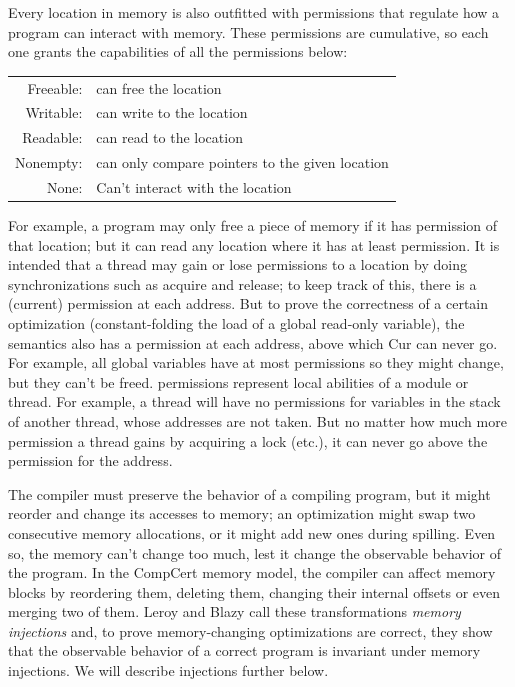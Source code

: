 Every location in memory is also outfitted with permissions that regulate how a program can interact with memory. These permissions are cumulative, so each one grants the capabilities of all the permissions below:

\begin{tabular}{rl} 
Freeable: & can free the location \\
Writable: & can write to the location\\
Readable: & can read to the location\\
Nonempty: & can only compare pointers to the given location\\
None: & Can't interact with the location\\
\end{tabular}

For example, a program may only free a piece of memory if it has  permission of that location; but it can read any location where it has at least  permission. 
It is intended that a thread may gain or lose permissions to a location by doing synchronizations such as acquire and release; to keep track of this, there is a  (current) permission at each address.  But to prove the correctness of a certain optimization (constant-folding the load of a global read-only variable), the semantics also has a  permission at each address, above which Cur can never go.
For example, all global variables have at most   permissions so they might change, but they can't be freed.  permissions represent local abilities of a module or thread. For example, a thread will have no permissions for variables in the stack of another thread, whose addresses are not taken. But no matter how much more  permission a thread gains by acquiring a lock (etc.), it can never go above the  permission for the address.

The compiler must preserve the behavior of a compiling program, but it might reorder and change its accesses to memory; an optimization might swap two consecutive memory allocations, or it might add new ones during spilling. Even so, the memory can't change too much, lest it change the observable behavior of the program. In the CompCert memory model, the compiler can affect memory blocks by reordering them, deleting them, changing their internal offsets or even merging two of them. Leroy and Blazy \cite{Leroy-Blazy-memory-model} call these transformations \emph{memory injections} and, to prove memory-changing optimizations are correct, they show that the observable behavior of a correct program is invariant under memory injections. We will describe injections further below.


